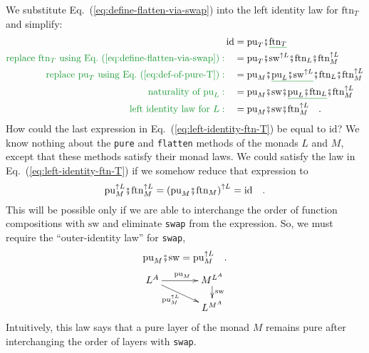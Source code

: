We substitute Eq.~(\ref{eq:define-flatten-via-swap}) into the left
identity law for $\text{ftn}_{T}$ and simplify:
\begin{align}
\text{id} & =\text{pu}_{T}\bef\gunderline{\text{ftn}_{T}}\nonumber \\
{\color{greenunder}\text{replace }\text{ftn}_{T}\text{ using Eq.~(\ref{eq:define-flatten-via-swap})}:}\quad & =\text{pu}_{T}\bef\text{sw}^{\uparrow L}\bef\text{ftn}_{L}\bef\text{ftn}_{M}^{\uparrow L}\nonumber \\
{\color{greenunder}\text{replace }\text{pu}_{T}\text{ using Eq.~(\ref{eq:def-of-pure-T})}:}\quad & =\text{pu}_{M}\bef\gunderline{\text{pu}_{L}\bef\text{sw}^{\uparrow L}}\bef\text{ftn}_{L}\bef\text{ftn}_{M}^{\uparrow L}\nonumber \\
{\color{greenunder}\text{naturality of }\text{pu}_{L}:}\quad & =\text{pu}_{M}\bef\text{sw}\bef\gunderline{\text{pu}_{L}\bef\text{ftn}_{L}}\bef\text{ftn}_{M}^{\uparrow L}\nonumber \\
{\color{greenunder}\text{left identity law for }L:}\quad & =\text{pu}_{M}\bef\text{sw}\bef\text{ftn}_{M}^{\uparrow L}\quad.\label{eq:left-identity-ftn-T}
\end{align}
How could the last expression in Eq.~(\ref{eq:left-identity-ftn-T})
be equal to $\text{id}$? We know nothing about the \texttt{}\lstinline!pure!
and \texttt{}\lstinline!flatten!
methods of the monads $L$ and $M$, except that these methods satisfy
their monad laws. We could satisfy the law in Eq.~(\ref{eq:left-identity-ftn-T})
if we somehow reduce that expression to
\[
\text{pu}_{M}^{\uparrow L}\bef\text{ftn}_{M}^{\uparrow L}=\left(\text{pu}_{M}\bef\text{ftn}_{M}\right)^{\uparrow L}=\text{id}\quad.
\]
This will be possible only if we are able to interchange the order
of function compositions with $\text{sw}$ and eliminate \lstinline!swap!
from the expression. So, we must require the ``outer-identity law''
for \lstinline!swap!,
\begin{equation}
\text{pu}_{M}\bef\text{sw}=\text{pu}_{M}^{\uparrow L}\quad.\label{eq:swap-law-1-M-identity}
\end{equation}
\[
\xymatrix{\xyScaleY{1pc}\xyScaleX{3pc}L^{A}\ar[r]\sp(0.5){\text{pu}_{M}}\ar[rd]\sb(0.4){\text{pu}_{M}^{\uparrow L}} & M^{L^{A}}\ar[d]\sp(0.4){\text{sw}}\\
 & L^{M^{A}}
}
\]
Intuitively, this law says that a pure layer of the monad $M$ remains
pure after interchanging the order of layers with \lstinline!swap!.

